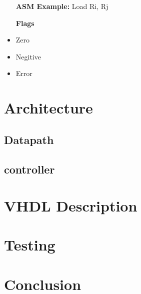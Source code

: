 \documentclass[a4paper,14pt]{article}
\begin{document}
\begin{itemize}
    \setlength{\parskip}{0pt}
    \setlength{\itemsep}{0pt plus 1pt}
    \setlength{\itemindent}{-4mm}
    \item[] \textbf{ASM Example:} Load Ri, Rj
\end{itemize}
\begin{itemize}
    \setlength{\parskip}{0pt}
    \setlength{\itemsep}{0pt plus 1pt}
    \setlength{\itemindent}{7mm}
    \item [\textbf{Flags}]
    \item Zero
    \item Negitive
    \item Error
\end{itemize}





\section{Architecture}
\subsection{Datapath}
\subsection{controller}
\section{VHDL Description}
\section{Testing}
\section{Conclusion}
\end{document}
